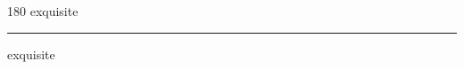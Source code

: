 
\begin{frame}
\begin{center}
\begin{turn}{180}
{\fontsize{2.5cm}{1em}\selectfont exquisite}
\end{turn}
\vspace{1em}\par  
\hrule
\vspace{1em}\par  
{\fontsize{2.5cm}{1em}\selectfont exquisite}
\end{center}
\end{frame}

